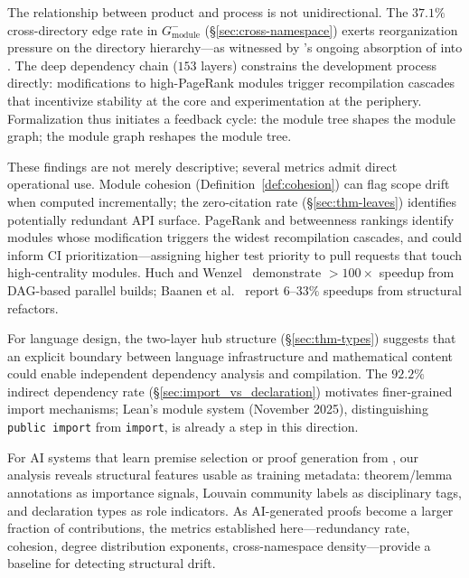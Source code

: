 The relationship between product and process is not unidirectional. The $37.1\%$ cross-directory edge rate in $G_{\mathrm{module}}^{-}$ (\S\ref{sec:cross-namespace}) exerts reorganization pressure on the directory hierarchy---as witnessed by 's ongoing absorption of  into . The deep dependency chain ($153$ layers) constrains the development process directly: modifications to high-PageRank modules trigger recompilation cascades that incentivize stability at the core and experimentation at the periphery. Formalization thus initiates a feedback cycle: the module tree shapes the module graph; the module graph reshapes the module tree.

\label{sec:practice}
These findings are not merely descriptive; several metrics admit direct operational use. Module cohesion (Definition~\ref{def:cohesion}) can flag scope drift when computed incrementally; the zero-citation rate (\S\ref{sec:thm-leaves}) identifies potentially redundant API surface. PageRank and betweenness rankings identify modules whose modification triggers the widest recompilation cascades, and could inform CI prioritization---assigning higher test priority to pull requests that touch high-centrality modules. Huch and Wenzel~\cite{huch2024} demonstrate ${>}100\times$ speedup from DAG-based parallel builds; Baanen et al.~\cite{baanen2025} report $6$--$33\%$ speedups from structural refactors.

For language design, the two-layer hub structure (\S\ref{sec:thm-types}) suggests that an explicit boundary between language infrastructure and mathematical content could enable independent dependency analysis and compilation. The $92.2\%$ indirect dependency rate (\S\ref{sec:import_vs_declaration}) motivates finer-grained import mechanisms; Lean's module system (November 2025), distinguishing \texttt{public import} from \texttt{import}, is already a step in this direction.

For AI systems that learn premise selection or proof generation from , our analysis reveals structural features usable as training metadata: theorem/lemma annotations as importance signals, Louvain community labels as disciplinary tags, and declaration types as role indicators. As AI-generated proofs become a larger fraction of contributions, the metrics established here---redundancy rate, cohesion, degree distribution exponents, cross-namespace density---provide a baseline for detecting structural drift.

